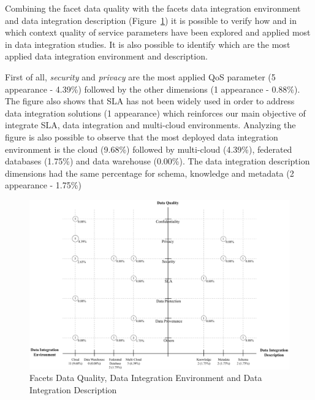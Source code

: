 Combining the facet data quality with the facets data integration environment and data integration description
(Figure~\ref{fig:facet4}) it is possible to verify how and in which context
quality of service parameters have been explored and applied most in data
integration studies. It is also possible to identify which are the most applied
data integration environment and description.

First of all, \textit{security} and \textit{privacy} are the most applied QoS
parameter (5 appearance - 4.39\%) followed by the other dimensions (1 appearance - 0.88\%). 
The figure also shows that SLA has not been widely used in order to address data integration solutions
(1 appearance) which reinforces our main objective of integrate SLA, data integration and multi-cloud 
environments. 
Analyzing the figure is also possible to observe that the most deployed data integration environment is 
the cloud (9.68\%) followed by multi-cloud (4.39\%), federated databases (1.75\%) and data warehouse (0.00\%).
The data integration description dimensions had the same percentage for schema, knowledge and metadata (2 appearance - 1.75\%)

\begin{figure}[!h]
\centering
\includegraphics[scale=0.53]{figs/bubble-charts/Data-Quality-DI.pdf}
\caption{Facets Data Quality, Data Integration Environment and Data Integration Description}\label{fig:facet4}
\end{figure}
% 
